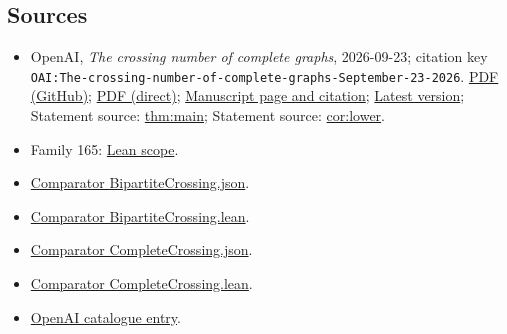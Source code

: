 \documentclass[11pt]{article}
\begin{document}
\subsection{Sources}
\begin{itemize}
\item OpenAI, \emph{The crossing number of complete graphs}, 2026-09-23; citation key \texttt{OAI:The-crossing-number-of-complete-graphs-September-23-2026}. \href{https://github.com/openai/math/blob/adc7f1241b42e322a6451854ab7e4b4c146bf78a/preprints/The-crossing-number-of-complete-graphs-September-23-2026/paper.pdf}{PDF (GitHub)}; \href{https://github.com/openai/math/raw/adc7f1241b42e322a6451854ab7e4b4c146bf78a/preprints/The-crossing-number-of-complete-graphs-September-23-2026/paper.pdf}{PDF (direct)}; \href{https://github.com/openai/math/blob/adc7f1241b42e322a6451854ab7e4b4c146bf78a/preprints/The-crossing-number-of-complete-graphs-September-23-2026/README.md}{Manuscript page and citation}; \href{https://github.com/openai/math/blob/main/preprints/The-crossing-number-of-complete-graphs-September-23-2026/paper.pdf}{Latest version}; Statement source: \href{https://github.com/openai/math/blob/adc7f1241b42e322a6451854ab7e4b4c146bf78a/preprints/The-crossing-number-of-complete-graphs-September-23-2026/build/main.tex\#L117}{thm:main}; Statement source: \href{https://github.com/openai/math/blob/adc7f1241b42e322a6451854ab7e4b4c146bf78a/preprints/The-crossing-number-of-complete-graphs-September-23-2026/build/main.tex\#L690}{cor:lower}.
\item Family 165: \href{https://github.com/openai/math/blob/adc7f1241b42e322a6451854ab7e4b4c146bf78a/lean/docs/165.md}{Lean scope}.
\item \href{https://github.com/openai/math/blob/adc7f1241b42e322a6451854ab7e4b4c146bf78a/lean/ComparatorChallenges/BipartiteCrossing.json}{Comparator BipartiteCrossing.json}.
\item \href{https://github.com/openai/math/blob/adc7f1241b42e322a6451854ab7e4b4c146bf78a/lean/ComparatorChallenges/BipartiteCrossing.lean}{Comparator BipartiteCrossing.lean}.
\item \href{https://github.com/openai/math/blob/adc7f1241b42e322a6451854ab7e4b4c146bf78a/lean/ComparatorChallenges/CompleteCrossing.json}{Comparator CompleteCrossing.json}.
\item \href{https://github.com/openai/math/blob/adc7f1241b42e322a6451854ab7e4b4c146bf78a/lean/ComparatorChallenges/CompleteCrossing.lean}{Comparator CompleteCrossing.lean}.
\item \href{https://github.com/openai/math/blob/adc7f1241b42e322a6451854ab7e4b4c146bf78a/CONTENTS.md}{OpenAI catalogue entry}.
\end{itemize}
\end{document}
